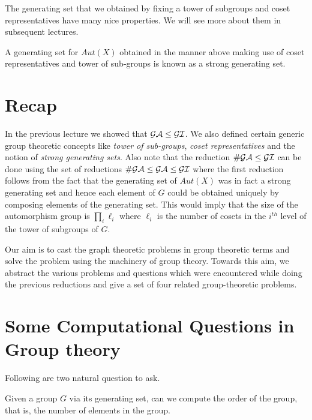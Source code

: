 The generating set that we obtained by fixing a tower of subgroups and coset
representatives have many nice properties. We will see more about them in
subsequent lectures.
\begin{definition}
	A generating set for $Aut(X)$ obtained in the manner above making use
	of coset representatives and tower of sub-groups is known as a strong
	generating set.  
\end{definition}




\section {Recap}
In the previous lecture we showed that $\cal{GA} \le \cal{GI}$. We also
defined certain generic group theoretic concepts like {\it tower of
sub-groups}, {\it coset representatives} and the notion of {\it strong
generating sets}.  Also note that the reduction $\cal{\#GA} \le \cal{GI}$ can
be done using the set of reductions ${\cal{\#GA} \le \cal{GA} \le \cal{GI}}$
where the first reduction follows from the fact that the generating set of
$Aut(X)$ was in fact a strong generating set and hence each element of $G$
could be obtained uniquely by composing elements of the generating set. 
This would imply that the size of the automorphism group is $\displaystyle
\prod_{i} \ell_{i}$ where $\ell_i$ is the number of cosets in the $i^{th}$
level of the tower of subgroups of $G$.

Our aim is to cast the graph theoretic problems in group theoretic terms and
solve the problem using the machinery of group theory.  Towards this aim, we
abstract the various problems and questions which were encountered while
doing the previous reductions and give a set of four related group-theoretic
problems.

\section{Some Computational Questions in Group theory}
Following are two natural question to ask.
\begin{problem}
	Given a group $G$ via its generating set, can we compute the order of
	the group, that is, the number of elements in the group.
\end{problem}


